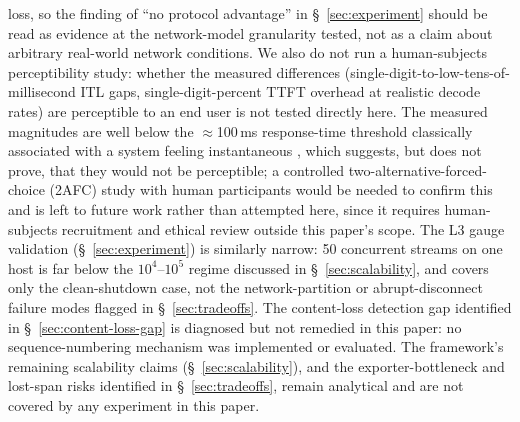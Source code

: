 \documentclass[11pt]{article}
\begin{document}
loss, so the finding of ``no protocol advantage'' in \S~\ref{sec:experiment} should be read as evidence at the network-model granularity tested, not as a claim about arbitrary real-world network conditions. We also do not run a human-subjects perceptibility study: whether the measured differences (single-digit-to-low-tens-of-millisecond ITL gaps, single-digit-percent TTFT overhead at realistic decode rates) are perceptible to an end user is not tested directly here. The measured magnitudes are well below the $\approx$100\,ms response-time threshold classically associated with a system feeling instantaneous \cite{miller1968}, which suggests, but does not prove, that they would not be perceptible; a controlled two-alternative-forced-choice (2AFC) study with human participants would be needed to confirm this and is left to future work rather than attempted here, since it requires human-subjects recruitment and ethical review outside this paper's scope. The L3 gauge validation (\S~\ref{sec:experiment}) is similarly narrow: 50 concurrent streams on one host is far below the $10^4$--$10^5$ regime discussed in \S~\ref{sec:scalability}, and covers only the clean-shutdown case, not the network-partition or abrupt-disconnect failure modes flagged in \S~\ref{sec:tradeoffs}. The content-loss detection gap identified in \S~\ref{sec:content-loss-gap} is diagnosed but not remedied in this paper: no sequence-numbering mechanism was implemented or evaluated. The framework's remaining scalability claims (\S~\ref{sec:scalability}), and the exporter-bottleneck and lost-span risks identified in \S~\ref{sec:tradeoffs}, remain analytical and are not covered by any experiment in this paper.

\end{document}
